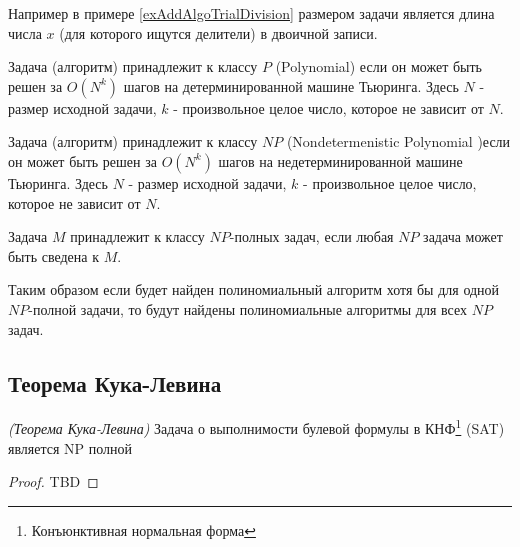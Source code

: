 Например в примере \ref{exAddAlgoTrialDivision} размером задачи
является длина числа $x$ (для которого ищутся делители) в двоичной
записи. 

\begin{definition}[Класс $P$]
Задача (алгоритм) принадлежит к классу $P$ (Polynomial) если он может
быть решен за 
 $O\left(N^k\right)$ шагов на детерминированной машине Тьюринга.
Здесь $N$ - размер исходной задачи, $k$ - произвольное целое число,
которое не зависит от $N$.  
\end{definition}

\begin{definition}[Класс $NP$]
Задача (алгоритм) принадлежит к классу $NP$ (Nondetermenistic Polynomial )если
он может быть решен за  $O\left(N^k\right)$ шагов на
недетерминированной машине Тьюринга.  Здесь $N$ - размер исходной
задачи, $k$ - произвольное целое число, которое не зависит от $N$. 
\end{definition}

\begin{definition}
Задача $M$ принадлежит к классу $NP$-полных задач, если любая $NP$ задача
может быть сведена к $M$.
\end{definition}

Таким образом если будет найден полиномиальный алгоритм хотя бы для
одной $NP$-полной задачи, то будут найдены полиномиальные алгоритмы
для всех $NP$ задач.

\subsection{Теорема Кука-Левина}

\begin{theorem}
\emph{(Теорема Кука-Левина)}
Задача о выполнимости булевой формулы в КНФ\footnote{Конъюнктивная нормальная форма} (SAT) является NP полной
\label{theoremAddAlgoCookTheorem}
\end{theorem}

\begin{proof}
TBD
\end{proof}
